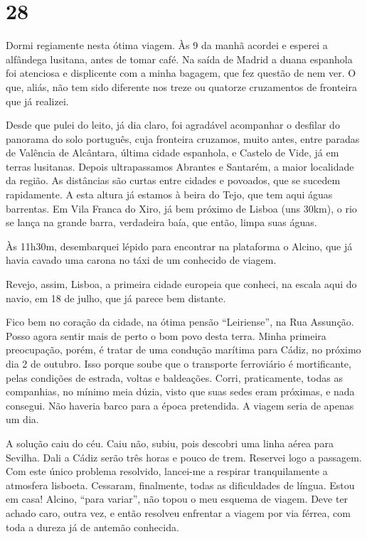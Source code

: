 \section*{28 \adfflatleafright {}}
Dormi regiamente nesta ótima viagem. Às 9 da manhã acordei e esperei a alfândega lusitana, antes de tomar café. Na saída de Madrid a duana espanhola foi atenciosa e displicente com a minha bagagem, que fez questão de nem ver. O que, aliás, não tem sido diferente nos treze ou quatorze cruzamentos de fronteira que já realizei.

Desde que pulei do leito, já dia claro, foi agradável acompanhar o desfilar do panorama do solo português, cuja fronteira cruzamos, muito antes, entre paradas de Valência de Alcântara, última cidade espanhola, e Castelo de Vide, já em terras lusitanas. Depois ultrapassamos Abrantes e Santarém, a maior localidade da região. As distâncias são curtas entre cidades e povoados, que se sucedem rapidamente. A esta altura já estamos à beira do Tejo, que tem aqui águas barrentas. Em Vila Franca do Xiro, já bem próximo de Lisboa (uns 30km), o rio se lança na grande barra, verdadeira baía, que então, limpa suas águas.

Às 11h30m, desembarquei lépido para encontrar na plataforma o Alcino, que já havia cavado uma carona no táxi de um conhecido de viagem.

Revejo, assim, Lisboa, a primeira cidade europeia que conheci, na escala aqui do navio, em 18 de julho, que já parece bem distante.

Fico bem no coração da cidade, na ótima pensão ``Leiriense'', na Rua Assunção. Posso agora sentir mais de perto o bom povo desta terra. Minha primeira preocupação, porém, é tratar de uma condução marítima para Cádiz, no próximo dia 2 de outubro. Isso porque soube que o transporte ferroviário é mortificante, pelas condições de estrada, voltas e baldeações. Corri, praticamente, todas as companhias, no mínimo meia dúzia, visto que suas sedes eram próximas, e nada consegui. Não haveria barco para a época pretendida. A viagem seria de apenas um dia.

A solução caiu do céu. Caiu não, subiu, pois descobri uma linha aérea para Sevilha. Dali a Cádiz serão três horas e pouco de trem. Reservei logo a passagem. Com este único problema resolvido, lancei-me a respirar tranquilamente a atmosfera lisboeta. Cessaram, finalmente, todas as dificuldades de língua. Estou em casa! Alcino, ``para variar'', não topou o meu esquema de viagem. Deve ter achado caro, outra vez, e então resolveu enfrentar a viagem por via férrea, com toda a dureza já de antemão conhecida.


